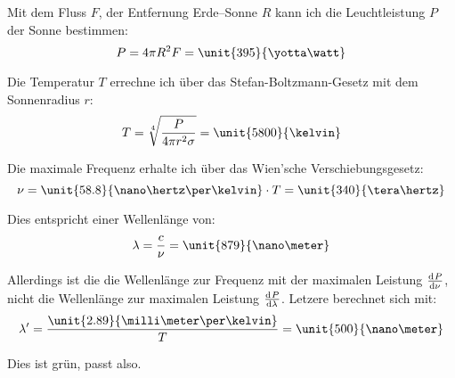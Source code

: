Mit dem Fluss $F$, der Entfernung Erde--Sonne $R$ kann ich die Leuchtleistung
$P$ der Sonne bestimmen:
\[
	P = 4 \pi R^2 F = \unit{395}{\yotta\watt}
\]

Die Temperatur $T$ errechne ich über das Stefan-Boltzmann-Gesetz mit dem
Sonnenradius $r$:
\[
	T = \sqrt[4]{\frac{P}{4 \pi r^2 \sigma}} = \unit{5800}{\kelvin}
\]

Die maximale Frequenz erhalte ich über das Wien'sche Verschiebungsgesetz:
\[
	\nu = \unit{58.8}{\nano\hertz\per\kelvin} \cdot T = \unit{340}{\tera\hertz}
\]

Dies entspricht einer Wellenlänge von:
\[
	\lambda = \frac c\nu = \unit{879}{\nano\meter}
\]

Allerdings ist die die Wellenlänge zur Frequenz mit der maximalen Leistung $\od P\nu$, nicht die Wellenlänge zur maximalen Leistung $\od P\lambda$. Letzere berechnet sich mit:
\[
	\lambda' = \frac{\unit{2.89}{\milli\meter\per\kelvin}}T
	= \unit{500}{\nano\meter}
\]

Dies ist grün, passt also.

%
%



